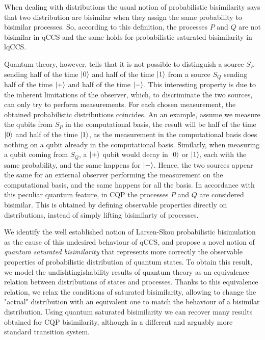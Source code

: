 When dealing with distributions the usual notion of  probabilistic bisimilarity says that two distribution are bisimilar when they assign the same probability to bisimilar processes. So, according to this definition, the processes $P$ and $Q$ are not bisimilar in qCCS and the same holds for probabilistic saturated bisimilarity in lqCCS.

Quantum theory, however, tells that it is not possible to distinguish a source $S_P$ sending half of the time $\ket{0}$ and half of the time $\ket{1}$ from a source $S_Q$ sending half of the time $\ket{+}$ and half of the time $\ket{-}$. This interesting property is due to the inherent limitations of the observer, which, to discriminate the two sources, can only try to perform measurements. For each chosen measurement, the obtained probabilistic distributions coincides. An an example, assume we measure the qubits from $S_P$ in the computational basis, the result will be half of the time $\ket{0}$ and half of the time $\ket{1}$, as the measurement in the computational basis does nothing on a qubit already in the computational basis. Similarly, when measuring a qubit coming from $S_Q$, a $\ket{+}$ qubit would decay in $\ket{0}$ or $\ket{1}$, each with the same probability, and the same happens for $\ket{-}$. Hence, the two sources appear the same for an external observer performing the measurement on the computational basis, and the same happens for all the basis. 
In accordance with this peculiar quantum feature, in CQP the processes $P$ and $Q$ are considered bisimilar. This is obtained by
defining observable properties directly on distributions, instead of simply lifting bisimilarty of processes.

We identify the well established notion of Larsen-Skou \cite{larsenBisimulationProbabilisticTesting1991} probabilistic bisimulation  as the cause of this undesired behaviour of qCCS, and propose a novel notion of \textit{quantum saturated bisimilarity} that represents more correctly the observable properties of probabilistic distribution of quantum states. To obtain this result, we model the undishtingishability results of quantum theory as an equivalence relation between distributions of states and processes.  
Thanks to this equivalence relation, we relax the conditions of saturated bisimilarity, allowing to change the "actual" distribution with an equivalent one to match the behaviour of a bisimilar distribution.
 Using quantum saturated bisimilarity we can recover many results obtained for CQP bisimilarity, although in a different and arguably more standard transition system.
 

